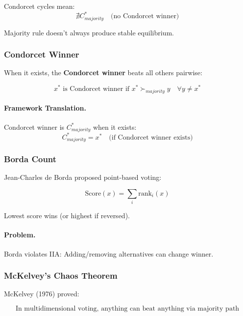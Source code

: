 Condorcet cycles mean:
\begin{equation}
\nexists C^*_{majority} \quad \text{(no Condorcet winner)}
\end{equation}

Majority rule doesn't always produce stable equilibrium.

\subsubsection{Condorcet Winner}

When it exists, the \textbf{Condorcet winner} beats all others pairwise:

\begin{equation}
x^* \text{ is Condorcet winner if } x^* \succ_{majority} y \quad \forall y \neq x^*
\end{equation}

\paragraph{Framework Translation.}
Condorcet winner is $C^*_{majority}$ when it exists:
\begin{equation}
C^*_{majority} = x^* \quad \text{(if Condorcet winner exists)}
\end{equation}

\subsubsection{Borda Count}

Jean-Charles de Borda proposed point-based voting:

\begin{equation}
\text{Score}(x) = \sum_i \text{rank}_i(x)
\end{equation}

Lowest score wins (or highest if reversed).

\paragraph{Problem.}
Borda violates IIA: Adding/removing alternatives can change winner.

\subsubsection{McKelvey's Chaos Theorem}

McKelvey (1976) proved:

\begin{equation}
\boxed{
\text{In multidimensional voting, anything can beat anything via majority path}
}
\label{eq:mckelvey}
\end{equation}

